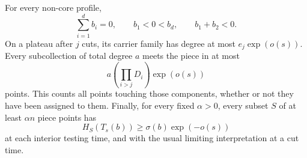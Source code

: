 \begin{proposition}\label{prof:budget}
For every non-core profile,
\begin{equation}\label{prof:balance}
 \sum_{i=1}^d b_i=0,\qquad b_1<0<b_d,\qquad b_1+b_2<0.
\end{equation}
On a plateau after $j$ cuts, its carrier family has degree at most
$e_j\exp(o(s))$.  Every subcollection of total degree $a$ meets the
piece in at most
\begin{equation}\label{prof:mass-budget}
 a\left(\prod_{i>j}D_i\right)\exp(o(s))
\end{equation}
points.  This counts all points touching those components, whether
or not they have been assigned to them.  Finally, for every fixed
$\alpha>0$, every subset $S$ of at least $\alpha n$ piece points has
\begin{equation}\label{prof:rank-budget}
 H_S(T_s(b))\ge\sigma(b)\exp(-o(s))
\end{equation}
at each interior testing time, and with the usual limiting
interpretation at a cut time.
\end{proposition}

